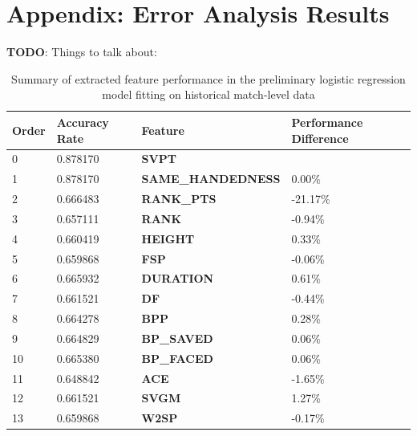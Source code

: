 \documentclass[paper=a4, fontsize=11pt]{scrartcl} %
\numberwithin{equation}{section} %
\numberwithin{figure}{section} %
\numberwithin{table}{section} %
\begin{document}
\section{Appendix: Error Analysis Results}
\textbf{TODO}: Things to talk about:
\begin{center}
\begin{table}[h]
    \begin{tabular}{  l | l | l | p{5cm} }
    \hline
Order &     Accuracy Rate    &         Feature    &  Performance Difference \\ \hline
0    &    0.878170 &              \textbf{SVPT}  &      \\ \hline
1    &    0.878170 &        \textbf{SAME\_HANDEDNESS}  & 0.00\% \\ \hline
2    &    0.666483 &          \textbf{RANK\_PTS} & -21.17\% \\ \hline
3    &    0.657111 &              \textbf{RANK} & -0.94\% \\ \hline
4    &    0.660419 &            \textbf{HEIGHT} & 0.33\% \\ \hline
5    &    0.659868 &  \textbf{FSP} & -0.06\% \\ \hline
6    &    0.665932 &       \textbf{DURATION} &  0.61\% \\ \hline
7    &    0.661521 &                \textbf{DF} & -0.44\% \\ \hline
8    &    0.664278 &    \textbf{BPP} &  0.28\% \\ \hline
9    &    0.664829 &         \textbf{BP\_SAVED} &  0.06\% \\ \hline
10   &    0.665380 &          \textbf{BP\_FACED}  & 0.06\% \\ \hline
11   &    0.648842 &    \textbf{ACE} & -1.65\% \\ \hline
12   &    0.661521 &             \textbf{SVGM} & 1.27\% \\ \hline
13   &    0.659868 & \textbf{W2SP} & -0.17\% \\ \hline
    \end{tabular}
    \caption{Summary of extracted feature performance in the preliminary logistic regression model fitting on historical match-level data}
    \label{tab:logreg_curr}
    \end{table}
\end{center}


 
\end{document}
